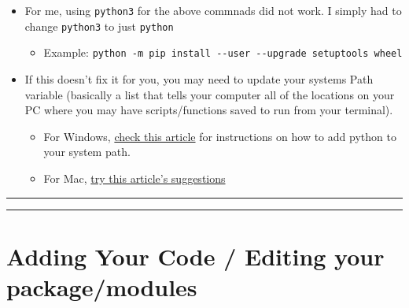 \documentclass[11pt]{article}
\providecommand{\tightlist}{%
      \setlength{\itemsep}{0pt}\setlength{\parskip}{0pt}}
\begin{document}
\begin{itemize}
\begin{itemize}
\begin{itemize}
      \begin{itemize}
      \tightlist
      \item
        For me, using \texttt{python3} for the above commnads did not
        work. I simply had to change \texttt{python3} to just
        \texttt{python}

        \begin{itemize}
        \tightlist
        \item
          Example:
          \texttt{python\ -m\ pip\ install\ -\/-user\ -\/-upgrade\ setuptools\ wheel}
        \end{itemize}
      \item
        If this doesn't fix it for you, you may need to update your
        systems Path variable (basically a list that tells your computer
        all of the locations on your PC where you may have
        scripts/functions saved to run from your terminal).

        \begin{itemize}
        \tightlist
        \item
          For Windows,
          \href{https://geek-university.com/python/add-python-to-the-windows-path/}{check
          this article} for instructions on how to add python to your
          system path.
        \item
          For Mac,
          \href{https://programwithus.com/learn-to-code/install-python3-mac/}{try
          this article's suggestions}
        \end{itemize}
      \end{itemize}
    \end{itemize}
  \end{itemize}
\end{itemize}

    \begin{center}\rule{0.5\linewidth}{\linethickness}\end{center}

\begin{center}\rule{0.5\linewidth}{\linethickness}\end{center}

\hypertarget{adding-your-code-editing-your-packagemodules}{%
\section{Adding Your Code / Editing your
package/modules}\label{adding-your-code-editing-your-packagemodules}}
\end{document}
